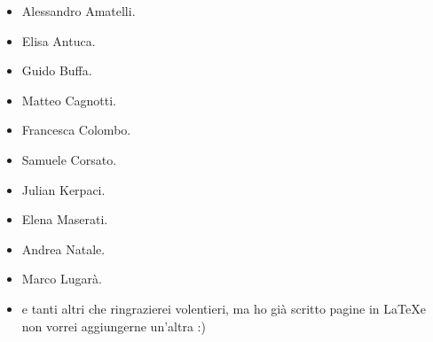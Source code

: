\begin{multicols}{2}
	\begin{itemize}
		\item Alessandro Amatelli.
		\item Elisa Antuca.
		\item Guido Buffa.
		\item Matteo Cagnotti.
		\item Francesca Colombo.
		\item Samuele Corsato.
		\item Julian Kerpaci.
		\item Elena Maserati.
		\item Andrea Natale.
		\item Marco Lugarà.
		\item e tanti altri che ringrazierei volentieri, ma ho già scritto \thelastpage pagine in \LaTeX e non vorrei aggiungerne un'altra :)
	\end{itemize}
\end{multicols}